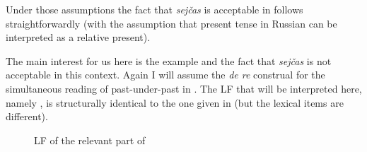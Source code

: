 \documentclass[output=paper,
modfonts,
newtxmath,
hidelinks
]{langscibook}
\begin{document}
\noindent Under those assumptions the fact that \textit{sejčas} is acceptable in  follows straightforwardly (with the assumption that present tense in Russian can be interpreted as a relative present).\largerpage[2]

The main interest for us here is the example  and the fact that \textit{sejčas} is not acceptable in this context. Again I will assume the \textit{de re} construal for the simultaneous reading of past-under-past in . The LF that will be interpreted here, namely , is structurally identical to the one given in  (but the lexical items are different).

\begin{figure}
\caption{LF of the relevant part of }\label{20:ex46}
\end{figure}
\end{document}
